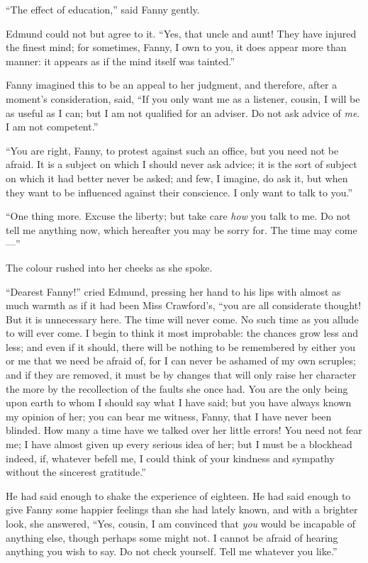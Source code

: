 \documentclass{article}
\begin{document}
``The effect of education,'' said Fanny gently.

Edmund could not but agree to it.  ``Yes, that uncle and aunt!
They have injured the finest mind; for sometimes,
Fanny, I own to you, it does appear more than manner:
it appears as if the mind itself was tainted.''

Fanny imagined this to be an appeal to her judgment,
and therefore, after a moment's consideration, said, ``If you
only want me as a listener, cousin, I will be as useful
as I can; but I am not qualified for an adviser.
Do not ask advice of \emph{me}.  I am not competent.''

``You are right, Fanny, to protest against such an office,
but you need not be afraid.  It is a subject on which I
should never ask advice; it is the sort of subject on
which it had better never be asked; and few, I imagine,
do ask it, but when they want to be influenced against
their conscience.  I only want to talk to you.''

``One thing more.  Excuse the liberty; but take care
\emph{how} you talk to me.  Do not tell me anything now,
which hereafter you may be sorry for.  The time may come---''

The colour rushed into her cheeks as she spoke.

``Dearest Fanny!'' cried Edmund, pressing her hand to
his lips with almost as much warmth as if it had been
Miss Crawford's, ``you are all considerate thought!
But it is unnecessary here.  The time will never come.
No such time as you allude to will ever come.  I begin to
think it most improbable:  the chances grow less and less;
and even if it should, there will be nothing to be
remembered by either you or me that we need be afraid of,
for I can never be ashamed of my own scruples; and if they
are removed, it must be by changes that will only raise
her character the more by the recollection of the faults
she once had.  You are the only being upon earth to whom
I should say what I have said; but you have always known
my opinion of her; you can bear me witness, Fanny, that I
have never been blinded.  How many a time have we
talked over her little errors!  You need not fear me;
I have almost given up every serious idea of her;
but I must be a blockhead indeed, if, whatever befell me,
I could think of your kindness and sympathy without the
sincerest gratitude.''

He had said enough to shake the experience of eighteen.
He had said enough to give Fanny some happier feelings
than she had lately known, and with a brighter look,
she answered, ``Yes, cousin, I am convinced that \emph{you}
would be incapable of anything else, though perhaps some
might not.  I cannot be afraid of hearing anything you
wish to say.  Do not check yourself.  Tell me whatever
you like.''
\end{document}

